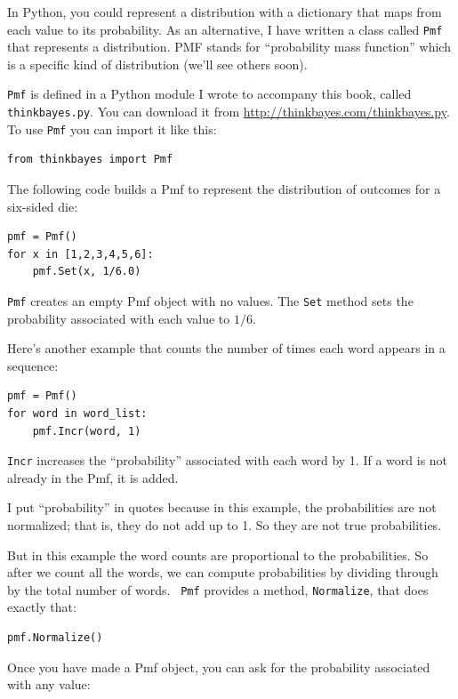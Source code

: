 \documentclass[12pt]{book}
\begin{document}
In Python, you could represent a distribution with a dictionary that
maps from each value to its probability.  As an alternative, I have
written a class called {\tt Pmf} that represents a distribution.  PMF
stands for ``probability mass function'' which is a specific
kind of distribution (we'll see others soon).

{\tt Pmf} is defined in a Python module I wrote to accompany this
book, called {\tt thinkbayes.py}.  You can download it from
\url{http://thinkbayes.com/thinkbayes.py}.  To use {\tt Pmf} you
can import it like this:

\begin{verbatim}
from thinkbayes import Pmf
\end{verbatim}

The following code builds a Pmf to represent the distribution
of outcomes for a six-sided die:

\begin{verbatim}
pmf = Pmf()
for x in [1,2,3,4,5,6]:
    pmf.Set(x, 1/6.0)
\end{verbatim}

\verb"Pmf" creates an empty Pmf object with no values.  The
\verb"Set" method sets the probability associated with each
value to $1/6$.

Here's another example that counts the number of times each word
appears in a sequence:

\begin{verbatim}
pmf = Pmf()
for word in word_list:
    pmf.Incr(word, 1)
\end{verbatim}

\verb"Incr" increases the ``probability'' associated with each
word by 1.  If a word is not already in the Pmf, it is added.

I put ``probability'' in quotes because in this example, the
probabilities are not normalized; that is, they do not add up to 1.
So they are not true probabilities.

But in this example the word counts are proportional to the
probabilities.  So after we count all the words, we can compute
probabilities by dividing through by the total number of words.  {\tt
  Pmf} provides a method, \verb"Normalize", that does exactly that:

\begin{verbatim}
pmf.Normalize()
\end{verbatim}

Once you have made a Pmf object, you can ask for the probability
associated with any value:
\end{document}
